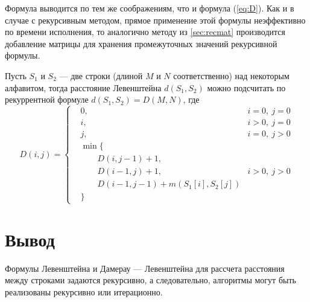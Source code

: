 Формула выводится по тем же соображениям, что и формула (\ref{eq:D}).
Как и в случае с рекурсивным методом, прямое применение этой формулы неэффективно по времени исполнения, то аналогично методу из \ref{sec:recmat} производится добавление матрицы для хранения промежуточных значений рекурсивной формулы.

Пусть $S_{1}$ и $S_{2}$ — две строки (длиной $M$ и $N$ соответственно) над некоторым алфавитом, тогда расстояние Левенштейна $d(S_{1},S_{2})$ можно подсчитать по рекуррентной формуле $d(S_{1},S_{2}) = D(M,N)$, где\\
\begin{equation}
	D(i,j) = 
	\left \{ \begin{aligned}
		& 0, & i = 0, \medspace j = 0\\
		& i, & i > 0, \medspace j = 0\\
		& j, & i = 0, \medspace j > 0\\
		& \min\{ &\\
		& \qquad D(i, j - 1) + 1, & \\
		& \qquad D(i - 1, j) + 1, & i > 0, \medspace j > 0\\
		& \qquad D(i - 1, j - 1) + m(S_{1}[i], S_{2}[j]) &\\
		& \} &
	\end{aligned} \right. 
\end{equation}

\section*{Вывод}

Формулы Левенштейна и Дамерау — Левенштейна для рассчета расстояния между строками задаются рекурсивно, а следовательно, алгоритмы могут быть реализованы рекурсивно или итерационно.


